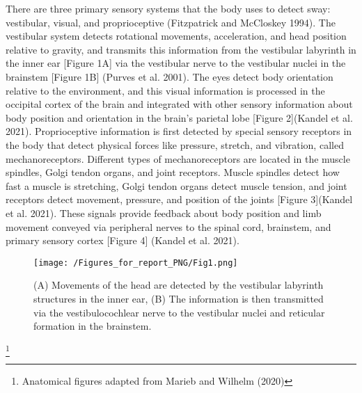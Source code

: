 \documentclass[
  letterpaper,
  DIV=11,
  numbers=noendperiod]{scrartcl}
\begin{document}
There are three primary sensory systems that the body uses to detect
sway: vestibular, visual, and proprioceptive (Fitzpatrick and McCloskey
1994). The vestibular system detects rotational movements, acceleration,
and head position relative to gravity, and transmits this information
from the vestibular labyrinth in the inner ear {[}Figure 1A{]} via the
vestibular nerve to the vestibular nuclei in the brainstem {[}Figure
1B{]} (Purves et al. 2001). The eyes detect body orientation relative to
the environment, and this visual information is processed in the
occipital cortex of the brain and integrated with other sensory
information about body position and orientation in the brain's parietal
lobe {[}Figure 2{]}(Kandel et al. 2021). Proprioceptive information is
first detected by special sensory receptors in the body that detect
physical forces like pressure, stretch, and vibration, called
mechanoreceptors. Different types of mechanoreceptors are located in the
muscle spindles, Golgi tendon organs, and joint receptors. Muscle
spindles detect how fast a muscle is stretching, Golgi tendon organs
detect muscle tension, and joint receptors detect movement, pressure,
and position of the joints {[}Figure 3{]}(Kandel et al. 2021). These
signals provide feedback about body position and limb movement conveyed
via peripheral nerves to the spinal cord, brainstem, and primary sensory
cortex {[}Figure 4{]} (Kandel et al. 2021).

\begin{figure}[H]

{\centering \texttt{[image: /Figures\_for\_report\_PNG/Fig1.png]}

}

\caption{(A) Movements of the head are detected by the vestibular
labyrinth structures in the inner ear, (B) The information is then
transmitted via the vestibulocochlear nerve to the vestibular nuclei and
reticular formation in the brainstem.}

\end{figure}%

\footnote{Anatomical figures adapted from Marieb and Wilhelm (2020)}
\end{document}
